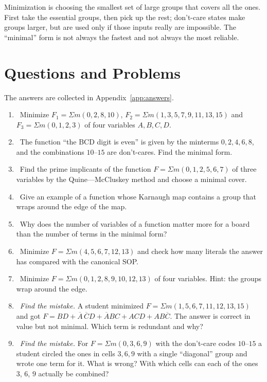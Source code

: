 \begin{ideabox}
Minimization is choosing the smallest set of large groups that covers all the
ones. First take the essential groups, then pick up the rest; don't-care
states make groups larger, but are used only if those inputs really are
impossible. The ``minimal'' form is not always the fastest and not always the
most reliable.
\end{ideabox}

\section{Questions and Problems}
\label{sec:tasks-minimize}

The answers are collected in Appendix~\ref{app:answers}.

\begin{taskbox}
\begin{enumerate}
  \item {}~Minimize $F_1=\Sigma m(0,2,8,10)$, $F_2=\Sigma m(1,3,5,7,9,11,13,15)$ and $F_3=\Sigma m(0,1,2,3)$ of four variables $A,B,C,D$.
  \item {}~The function ``the BCD digit is even'' is given by the minterms $0,2,4,6,8$, and the combinations $10$--$15$ are don't-cares. Find the minimal form.
  \item {}~Find the prime implicants of the function $F=\Sigma m(0,1,2,5,6,7)$ of three variables by the Quine---McCluskey method and choose a minimal cover.
  \item {}~Give an example of a function whose Karnaugh map contains a group that wraps around the edge of the map.
  \item {}~Why does the number of variables of a function matter more for a board than the number of terms in the minimal form?
  \item {}~Minimize $F=\Sigma m(4,5,6,7,12,13)$ and check how many literals the answer has compared with the canonical SOP.
  \item {}~Minimize $F=\Sigma m(0,1,2,8,9,10,12,13)$ of four variables. Hint: the groups wrap around the edge.
  \item {}~\emph{Find the mistake.} A student minimized $F=\Sigma m(1,5,6,7,11,12,13,15)$ and got $F=BD+\overline{A}\,\overline{C}D+\overline{A}BC+ACD+AB\overline{C}$. The answer is correct in value but not minimal. Which term is redundant and why?
  \item {}~\emph{Find the mistake.} For $F=\Sigma m(0,3,6,9)$ with the don't-care codes $10$--$15$ a student circled the ones in cells $3,6,9$ with a single ``diagonal'' group and wrote one term for it. What is wrong? With which cells can each of the ones $3$, $6$, $9$ actually be combined?

\end{enumerate}
\end{taskbox}
